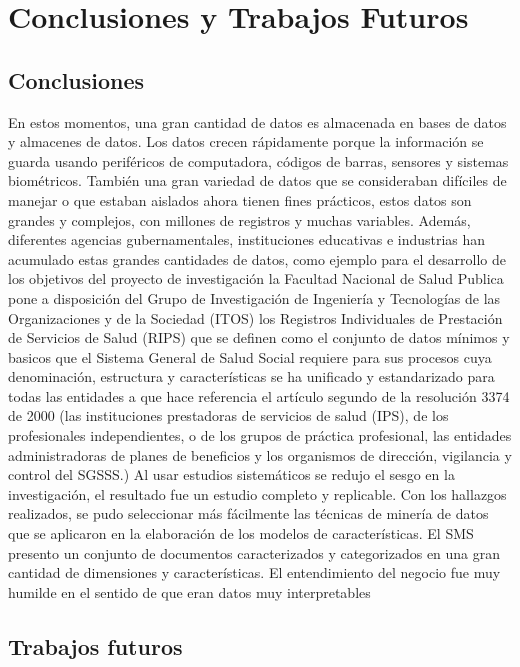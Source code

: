 \chapter{Conclusiones y Trabajos Futuros}

 \section{Conclusiones}



En estos momentos, una gran cantidad de datos es almacenada en bases de datos y almacenes de datos. Los datos crecen rápidamente porque la información se guarda usando periféricos de computadora, códigos de barras, sensores y sistemas biométricos. También una gran variedad de datos que se consideraban difíciles de manejar o que estaban aislados ahora tienen fines prácticos, estos datos son  grandes y complejos, con millones de registros y muchas variables. Además, diferentes agencias gubernamentales, instituciones educativas e industrias han acumulado estas grandes cantidades de datos, como ejemplo para el desarrollo de los objetivos del proyecto de investigación la Facultad Nacional de Salud Publica  pone a disposición del Grupo de Investigación de Ingeniería y Tecnologías de las Organizaciones y de la Sociedad (ITOS) los Registros Individuales de Prestación de Servicios de Salud (RIPS) que se definen como el conjunto de datos mínimos y basicos  que el Sistema General de Salud Social requiere para sus procesos cuya denominación, estructura y características se ha unificado y estandarizado para todas las entidades a que hace referencia el artículo segundo de la resolución 3374 de 2000 (las instituciones prestadoras de servicios de salud (IPS), de los profesionales independientes, o de los grupos de práctica profesional, las entidades administradoras de planes de beneficios y los organismos de dirección, vigilancia y control del SGSSS.) 
Al usar estudios sistemáticos  se redujo el sesgo en la investigación\cite{Petersen2015}, el resultado fue un estudio completo y replicable. Con los hallazgos realizados, se pudo seleccionar más fácilmente las técnicas de minería de datos que se aplicaron en la elaboración de los modelos de características. El SMS presento un conjunto de documentos caracterizados y categorizados en una gran cantidad de dimensiones y características.
 El entendimiento del negocio fue muy humilde en el sentido de que eran datos muy interpretables

\section{Trabajos futuros}